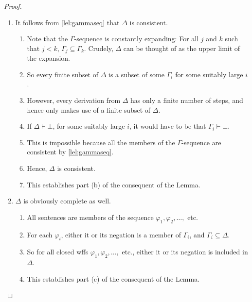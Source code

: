 \documentclass[12pt]{report}
\theoremstyle{nonumberplain}
\newtheorem{proof}{Proof}
\begin{document}
\begin{proof}
\begin{enumerate}
\item It follows from \ref{lel:gammaseq} that $Δ$ is consistent.
\begin{enumerate}[label={\alph*)}]
\item Note that the $Γ$-sequence is constantly
 expanding: For all $j$ and $k$ such that $j < k$,
 $Γ_j ⊆ Γ_k$. Crudely, $Δ$ can be thought of as the upper limit of the expansion.
\item So every finite subset of $Δ$ is a subset of some
 $Γ_i$ for some suitably large $i$.
\item However, every derivation from $Δ$ has only a finite number of steps, and hence only makes use of a finite subset of $Δ$.
\item If $Δ ⊢  ⊥$, for some suitably large $i$, it would
have to be that $Γ_i ⊢  ⊥$.
\item This is impossible because all the members of
 the $Γ$-sequence are consistent by \ref{lel:gammaseq}.
\item Hence, $Δ$ is consistent.
\item This establishes part (b) of the consequent of
 the Lemma.
\end{enumerate}

\item $Δ$ is obviously complete as well.
\begin{enumerate}[label={\alph*)}]
\item All sentences are members of the sequence
$φ_1, φ_2, \dotsc,$ etc.
\item For each $φ_i$, either it or its negation is a
 member of $Γ_i$, and $Γ_i ⊆ Δ$.
\item So for all closed wffs $φ_1, φ_2, \dotsc ,$ etc., either it
 or its negation is included in $Δ$.
\item This establishes part (c) of the consequent of the Lemma.
\end{enumerate}


\end{enumerate}
\end{proof}
\end{document}
